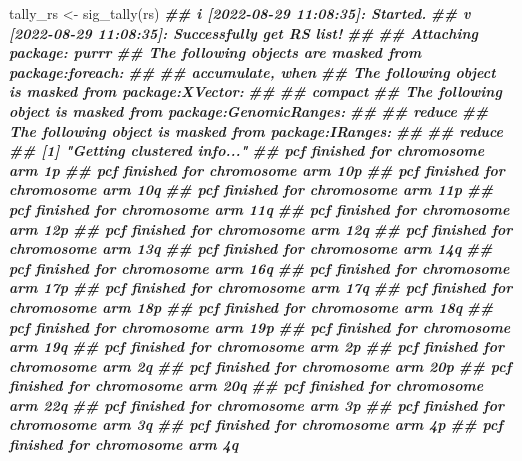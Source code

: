 \documentclass[
  12pt,
  a4paper,
  twoside]{book}
\newenvironment{Shaded}{\begin{snugshade}}{\end{snugshade}}
\newcommand{\DocumentationTok}[1]{\textcolor[rgb]{0.56,0.35,0.01}{\textbf{\textit{#1}}}}
\newcommand{\FunctionTok}[1]{\textcolor[rgb]{0.00,0.00,0.00}{#1}}
\newcommand{\NormalTok}[1]{#1}
\newcommand{\OtherTok}[1]{\textcolor[rgb]{0.56,0.35,0.01}{#1}}
\begin{document}
\begin{Shaded}
\begin{Highlighting}[]
\NormalTok{tally\_rs }\OtherTok{\textless{}{-}} \FunctionTok{sig\_tally}\NormalTok{(rs)}
\DocumentationTok{\#\# i [2022{-}08{-}29 11:08:35]: Started.}
\DocumentationTok{\#\# v [2022{-}08{-}29 11:08:35]: Successfully get RS list!}
\DocumentationTok{\#\# }
\DocumentationTok{\#\# Attaching package: \textquotesingle{}purrr\textquotesingle{}}
\DocumentationTok{\#\# The following objects are masked from \textquotesingle{}package:foreach\textquotesingle{}:}
\DocumentationTok{\#\# }
\DocumentationTok{\#\#     accumulate, when}
\DocumentationTok{\#\# The following object is masked from \textquotesingle{}package:XVector\textquotesingle{}:}
\DocumentationTok{\#\# }
\DocumentationTok{\#\#     compact}
\DocumentationTok{\#\# The following object is masked from \textquotesingle{}package:GenomicRanges\textquotesingle{}:}
\DocumentationTok{\#\# }
\DocumentationTok{\#\#     reduce}
\DocumentationTok{\#\# The following object is masked from \textquotesingle{}package:IRanges\textquotesingle{}:}
\DocumentationTok{\#\# }
\DocumentationTok{\#\#     reduce}
\DocumentationTok{\#\# [1] "Getting clustered info..."}
\DocumentationTok{\#\# pcf finished for chromosome arm 1p }
\DocumentationTok{\#\# pcf finished for chromosome arm 10p }
\DocumentationTok{\#\# pcf finished for chromosome arm 10q }
\DocumentationTok{\#\# pcf finished for chromosome arm 11p }
\DocumentationTok{\#\# pcf finished for chromosome arm 11q }
\DocumentationTok{\#\# pcf finished for chromosome arm 12p }
\DocumentationTok{\#\# pcf finished for chromosome arm 12q }
\DocumentationTok{\#\# pcf finished for chromosome arm 13q }
\DocumentationTok{\#\# pcf finished for chromosome arm 14q }
\DocumentationTok{\#\# pcf finished for chromosome arm 16q }
\DocumentationTok{\#\# pcf finished for chromosome arm 17p }
\DocumentationTok{\#\# pcf finished for chromosome arm 17q }
\DocumentationTok{\#\# pcf finished for chromosome arm 18p }
\DocumentationTok{\#\# pcf finished for chromosome arm 18q }
\DocumentationTok{\#\# pcf finished for chromosome arm 19p }
\DocumentationTok{\#\# pcf finished for chromosome arm 19q }
\DocumentationTok{\#\# pcf finished for chromosome arm 2p }
\DocumentationTok{\#\# pcf finished for chromosome arm 2q }
\DocumentationTok{\#\# pcf finished for chromosome arm 20p }
\DocumentationTok{\#\# pcf finished for chromosome arm 20q }
\DocumentationTok{\#\# pcf finished for chromosome arm 22q }
\DocumentationTok{\#\# pcf finished for chromosome arm 3p }
\DocumentationTok{\#\# pcf finished for chromosome arm 3q }
\DocumentationTok{\#\# pcf finished for chromosome arm 4p }
\DocumentationTok{\#\# pcf finished for chromosome arm 4q }

\end{Highlighting}
\end{Shaded}
\end{document}
